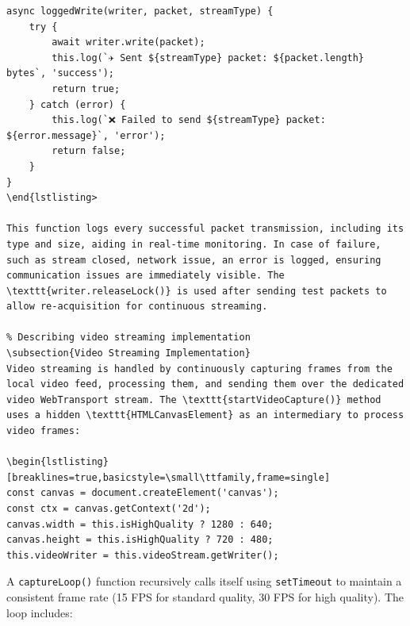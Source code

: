 \begin{lstlisting}[breaklines=true,basicstyle=\small\ttfamily,frame=single]
async loggedWrite(writer, packet, streamType) {
    try {
        await writer.write(packet);
        this.log(`✈️ Sent ${streamType} packet: ${packet.length} bytes`, 'success');
        return true;
    } catch (error) {
        this.log(`❌ Failed to send ${streamType} packet: ${error.message}`, 'error');
        return false;
    }
}
\end{lstlisting>

This function logs every successful packet transmission, including its type and size, aiding in real-time monitoring. In case of failure, such as stream closed, network issue, an error is logged, ensuring communication issues are immediately visible. The \texttt{writer.releaseLock()} is used after sending test packets to allow re-acquisition for continuous streaming.

% Describing video streaming implementation
\subsection{Video Streaming Implementation}
Video streaming is handled by continuously capturing frames from the local video feed, processing them, and sending them over the dedicated video WebTransport stream. The \texttt{startVideoCapture()} method uses a hidden \texttt{HTMLCanvasElement} as an intermediary to process video frames:

\begin{lstlisting}[breaklines=true,basicstyle=\small\ttfamily,frame=single]
const canvas = document.createElement('canvas');
const ctx = canvas.getContext('2d');
canvas.width = this.isHighQuality ? 1280 : 640;
canvas.height = this.isHighQuality ? 720 : 480;
this.videoWriter = this.videoStream.getWriter();
\end{lstlisting}

A \texttt{captureLoop()} function recursively calls itself using \texttt{setTimeout} to maintain a consistent frame rate (15 FPS for standard quality, 30 FPS for high quality). The loop includes:

